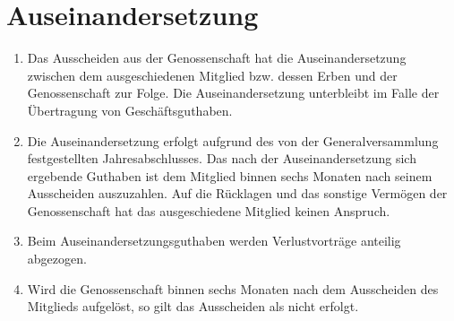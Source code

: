\documentclass[a4paper, 12pt]{scrartcl}
\begin{document}
\section{Auseinandersetzung}
\begin{enumerate}
  \item Das Ausscheiden aus der Genossenschaft hat die Auseinandersetzung zwischen dem ausgeschiedenen Mitglied bzw. dessen Erben und der Genossenschaft zur Folge. Die Auseinandersetzung unterbleibt im Falle der Übertragung von Geschäftsguthaben.
  \item Die Auseinandersetzung erfolgt aufgrund des von der Generalversammlung festgestellten Jahresabschlusses. Das nach der Auseinandersetzung sich ergebende Guthaben ist dem Mitglied binnen sechs Monaten nach seinem Ausscheiden auszuzahlen. Auf die Rücklagen und das sonstige Vermögen der Genossenschaft hat das ausgeschiedene Mitglied keinen Anspruch.
  \item Beim Auseinandersetzungsguthaben werden Verlustvorträge anteilig abgezogen.
  \item Wird die Genossenschaft binnen sechs Monaten nach dem Ausscheiden des Mitglieds aufgelöst, so gilt das Ausscheiden als nicht erfolgt.
\end{enumerate}
\end{document}
